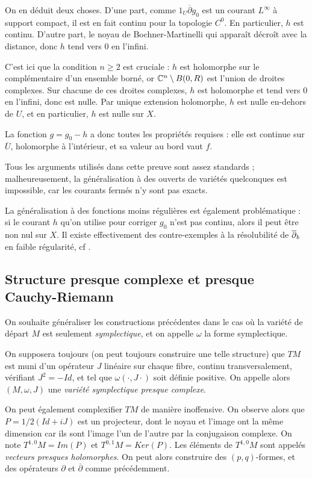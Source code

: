 \begin{preuve}
	 On en déduit deux choses. D'une part, comme $1_U\overline{\partial}g_0$ est un courant $L^{\infty}$ à support compact, il est en fait continu pour la topologie $C^0$. En particulier, $h$ est continu. D'autre part, le noyau de Bochner-Martinelli qui apparaît décroît avec la distance, donc $h$ tend vers $0$ en l'infini.
	
	C'est ici que la condition $n \geq 2$ est cruciale : $h$ est holomorphe sur le complémentaire d'un ensemble borné, or $\mathbb{C}^n \setminus B(0,R)$ est l'union de droites complexes. Sur chacune de ces droites complexes, $h$ est holomorphe et tend vers $0$ en l'infini, donc est nulle. Par unique extension holomorphe, $h$ est nulle en-dehors de $U$, et en particulier, $h$ est nulle sur $X$.
	
	La fonction $g=g_0-h$ a donc toutes les propriétés requises : elle est continue sur $\overline{U}$, holomorphe à l'intérieur, et sa valeur au bord vaut $f$.
\end{preuve}

Tous les arguments utilisés dans cette preuve sont assez standards ; malheureusement, la généralisation à des ouverts de variétés quelconques est impossible, car les courants fermés n'y sont pas exacts.

La généralisation à des fonctions moins régulières est également problématique : si le courant $h$ qu'on utilise pour corriger $g_0$ n'est pas continu, alors il peut être non nul sur $X$. Il existe effectivement des contre-exemples à la résolubilité de $\overline{\partial}_b$ en faible régularité, cf \cite{kohn1965extension}.

\subsection{Structure presque complexe et presque Cauchy-Riemann}
On souhaite généraliser les constructions précédentes dans le cas où la variété de départ $M$ est seulement \emph{symplectique}, et on appelle $\omega$ la forme symplectique.

On supposera toujours (on peut toujours construire une telle structure) que $TM$ est muni d'un opérateur $J$ linéaire sur chaque fibre, continu transversalement, vérifiant $J^2=-Id$, et tel que $\omega(\cdot, J\cdot)$ soit définie positive. On appelle alors $(M,\omega, J)$ une \emph{variété symplectique presque complexe}.

On peut également complexifier $TM$ de manière inoffensive. On observe alors que $P=1/2(Id+iJ)$ est un projecteur, dont le noyau et l'image ont la même dimension car ils sont l'image l'un de l'autre par la conjugaison complexe. On note $T^{1,0}M=Im(P)$ et $T^{0,1}M=Ker(P)$. Les éléments de $T^{1,0}M$ sont appelés \emph{vecteurs presques holomorphes}. On peut alors construire des $(p,q)$-formes, et des opérateurs $\partial$ et $\overline{\partial}$ comme précédemment.

